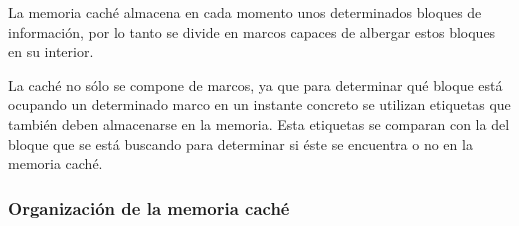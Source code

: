 La memoria caché almacena en cada momento unos determinados bloques de información, por lo tanto se divide en marcos capaces de albergar estos bloques en su interior.

La caché no sólo se compone de marcos, ya que para determinar qué bloque está ocupando un determinado marco en un instante concreto se utilizan etiquetas que también deben almacenarse en la memoria. Esta etiquetas se comparan con la del bloque que se está buscando para determinar si éste se encuentra o no en la memoria caché.

\subsubsection*{Organización de la memoria caché}

